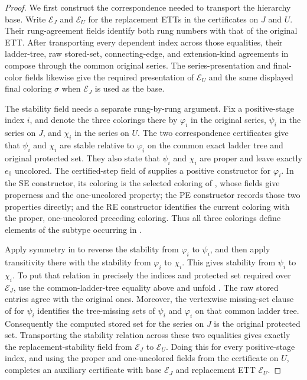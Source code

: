 \begin{proof}
We first construct the correspondence needed to transport the hierarchy
base.  Write $\mathcal E_J$ and $\mathcal E_U$ for the replacement ETTs
in the certificates on $J$ and $U$.  Their rung-agreement fields identify
both rung numbers with that of the original ETT.  After transporting every
dependent index across those equalities, their ladder-tree, raw stored-set,
connecting-edge, and extension-kind agreements in
 compose through the common
original series.  The series-presentation and final-color fields likewise
give the required presentation of $\mathcal E_U$ and the same displayed
final coloring $\sigma$ when $\mathcal E_J$ is used as the base.

The stability field needs a separate rung-by-rung argument.  Fix a
positive-stage index $i$, and denote the three colorings there by
$\varphi_i$ in the original series, $\psi_i$ in the series on $J$, and
$\chi_i$ in the series on $U$.  The two correspondence certificates give
that $\psi_i$ and $\chi_i$ are stable relative to $\varphi_i$ on the
common exact ladder tree and original protected set.  They also state that
$\psi_i$ and $\chi_i$ are proper and leave exactly $e_0$ uncolored.  The
certified-step field of  supplies a positive
 constructor for $\varphi_i$.  In the SE
constructor, its coloring is the selected coloring of
, whose fields give properness and the
one-uncolored property; the PE constructor records those two properties
directly; and the RE constructor identifies the current coloring with the
proper, one-uncolored preceding coloring.  Thus all three colorings define
elements of the subtype occurring in .

Apply symmetry in  to reverse the stability from
$\varphi_i$ to $\psi_i$, and then apply transitivity there with the
stability from $\varphi_i$ to $\chi_i$.  This gives stability from
$\psi_i$ to $\chi_i$.  To put that relation in precisely the indices and
protected set required over $\mathcal E_J$, use the common-ladder-tree
equality above and unfold .  The raw stored
entries agree with the original ones.  Moreover, the vertexwise
missing-set clause of  for $\psi_i$ identifies the
tree-missing sets of $\psi_i$ and $\varphi_i$ on that common ladder tree.
Consequently the computed stored set for the series on $J$ is the original
protected set.  Transporting the stability relation across these two
equalities gives exactly the replacement-stability field from
$\mathcal E_J$ to $\mathcal E_U$.  Doing this for every positive-stage
index, and using the proper and one-uncolored fields from the certificate
on $U$, completes an auxiliary
 certificate with base
$\mathcal E_J$ and replacement ETT $\mathcal E_U$.


\end{proof}
